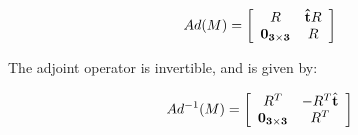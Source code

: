 \documentclass[a4paper,10pt]{article}
\begin{document}
\begin{equation}
  Ad(M) =
  \left[\begin{array}{c c}
    R & {\bf \hat{t}} R \\
    {\bf 0_{3 \times 3}} & R
  \end{array}\right]
\end{equation}

\noindent The adjoint operator is invertible, and is given by:

\begin{equation}
  Ad^{-1}(M) =
  \left[\begin{array}{c c}
    R^T & -R^T \hat{\bf t} \\
    {\bf 0_{3 \times 3}} & R^T
  \end{array}\right]
\end{equation}
\end{document}

